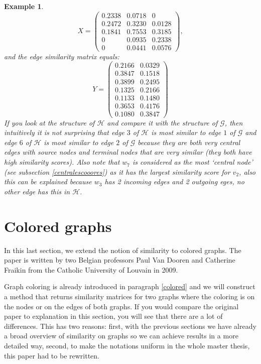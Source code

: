 \documentclass[a4paper,11pt]{report}
\newtheorem{example}[theorem]{Example}
\newcommand{\graf}{\mathscr{G}}
\newcommand{\grafeen}{\mathscr{H}}
\begin{document}
\begin{example}
$$X = \begin{pmatrix}
0.2338  &  0.0718  &       0\\
0.2472   & 0.3230  &  0.0128\\
0.1841   &  0.7553 &   0.3185\\
0  &  0.0935  &  0.2338\\
0   & 0.0441 &   0.0576
\end{pmatrix},$$
 and the edge similarity matrix equals:
 $$ Y = \begin{pmatrix}
0.2166 & 0.0329\\
0.3847 & 0.1518\\
0.3899 & 0.2495\\
0.1325 & 0.2166\\
0.1133 & 0.1480\\
0.3653 & 0.4176\\
0.1080 & 0.3847
\end{pmatrix}$$
If you look at the structure of $\grafeen$ and compare it with the structure of $\graf$, then 
intuitively it is not surprising that edge $3$ of $\grafeen$ is most similar to edge $1$ of 
$\graf$ and edge $6$ of $\grafeen$ is most similar to edge $2$ of $\graf$ because they are both very
central edges with source nodes and terminal nodes that are very similar (they both have high similarity scores). 
Also note that $w_7$ is considered as the most `central node' (see subsection \ref{centralescooores}) as it has the 
largest similarity score for $v_2$, also this can be explained because $w_3$ has 2 incoming edges and 2 outgoing
eges, no other edge has this in $\grafeen$. \end{example}
 


\section{Colored graphs}
In this last section, we extend the notion of similarity to colored graphs. The 
paper \cite{vandoren} is written by two Belgian professors Paul Van Dooren and 
Catherine Fraikin from the Catholic University of 
Louvain in 2009.

Graph coloring is already introduced in paragraph \ref{colored} and we will 
construct a method that returns similarity matrices for two graphs where the coloring is on the nodes or 
on the edges of both graphs. If you would compare the original paper to 
explanation in this section, you will see that there are a lot of differences. 
This has two reasons: first, with the previous sections we have already a broad overview of 
similarity on graphs so we can achieve results in a more detailed way, second, to make 
the notations uniform in the whole master thesis, this paper had to be 
rewritten.
\end{document}
